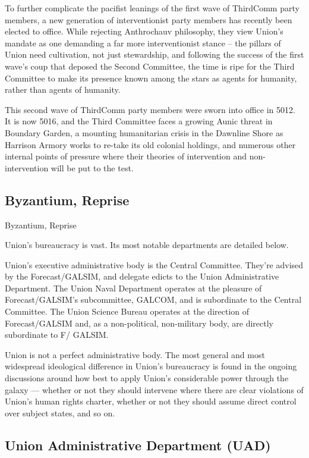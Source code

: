 To further complicate the pacifist leanings of the first wave of ThirdComm party members, a new
generation of interventionist party members has recently been elected to office. While rejecting
Anthrochauv philosophy, they view Union’s mandate as one demanding a far more interventionist
stance -- the pillars of Union need cultivation, not just stewardship, and following the success of
the first wave’s coup that deposed the Second Committee, the time is ripe for the Third
Committee to make its presence known among the stars as agents for humanity, rather than
agents of humanity.

This second wave of ThirdComm party members were sworn into office in 5012. It is now 5016,
and the Third Committee faces a growing Aunic threat in Boundary Garden, a mounting
humanitarian crisis in the Dawnline Shore as Harrison Armory works to re-take its old colonial
holdings, and numerous other internal points of pressure where their theories of intervention and
non-intervention will be put to the test.



\subsection{Byzantium, Reprise }


Byzantium, Reprise

Union’s bureaucracy is vast. Its most notable departments are detailed below.


Union’s executive administrative body is the Central Committee. They’re advised by the
Forecast/GALSIM, and delegate edicts to the Union Administrative Department. The Union Naval
Department operates at the pleasure of Forecast/GALSIM’s subcommittee, GALCOM, and is
subordinate to the Central Committee. The Union Science Bureau operates at the direction of
Forecast/GALSIM and, as a non-political, non-military body, are directly subordinate to F/
GALSIM.


Union is not a perfect administrative body. The most general and most widespread ideological
difference in Union’s bureaucracy is found in the ongoing discussions around how best to apply
Union’s considerable power through the galaxy — whether or not they should intervene where
there are clear violations of Union’s human rights charter, whether or not they should assume
direct control over subject states, and so on.


\subsection{Union Administrative Department (UAD)}

